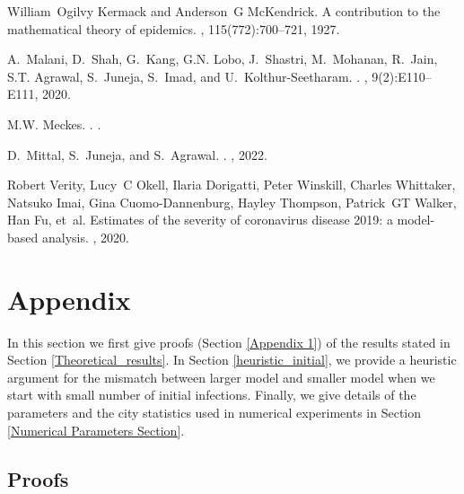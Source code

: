 \documentclass{article}
\theoremstyle{definition}
\begin{document}
\begin{thebibliography}{10}
William~Ogilvy Kermack and Anderson~G McKendrick.
\newblock A contribution to the mathematical theory of epidemics.
, 115(772):700--721, 1927.

A.~Malani, D.~Shah, G.~Kang, G.N. Lobo, J.~Shastri, M.~Mohanan, R.~Jain, S.T.
  Agrawal, S.~Juneja, S.~Imad, and U.~Kolthur-Seetharam.
.
, 9(2):E110--E111, 2020.

M.W. Meckes.
.
.

D.~Mittal, S.~Juneja, and S.~Agrawal.
.
,
  2022.

Robert Verity, Lucy~C Okell, Ilaria Dorigatti, Peter Winskill, Charles
  Whittaker, Natsuko Imai, Gina Cuomo-Dannenburg, Hayley Thompson, Patrick~GT
  Walker, Han Fu, et~al.
\newblock Estimates of the severity of coronavirus disease 2019: a model-based
  analysis.
, 2020.

\end{thebibliography}

        

\section{Appendix}
\label{appendix}
In this section we first give proofs (Section \ref{Appendix 1}) of the results stated in Section \ref{Theoretical_results}. In Section \ref{heuristic_initial}, we provide a heuristic argument for the mismatch between larger model and smaller model when we start with small number of initial infections. Finally, we give details of the parameters and the city statistics used in numerical experiments in Section \ref{Numerical Parameters Section}.

\subsection{Proofs}
\end{document}
